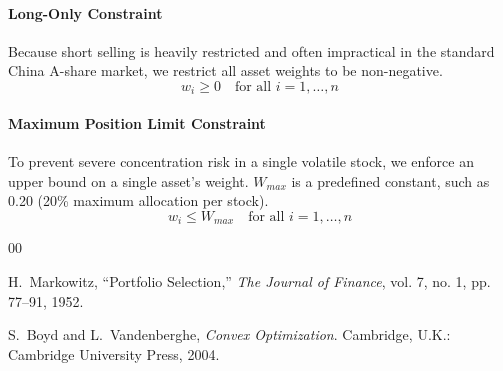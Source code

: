 \documentclass[conference]{IEEEtran}
\begin{document}
\paragraph{Long-Only Constraint}
Because short selling is heavily restricted and often impractical in the standard China A-share market, we restrict all asset weights to be non-negative.
\begin{equation}
    w_i \ge 0 \quad \text{for all } i=1, \dots, n
\end{equation}

\paragraph{Maximum Position Limit Constraint}
To prevent severe concentration risk in a single volatile stock, we enforce an upper bound on a single asset's weight. $W_{max}$ is a predefined constant, such as 0.20 (20\% maximum allocation per stock).
\begin{equation}
    w_i \le W_{max} \quad \text{for all } i=1, \dots, n
\end{equation}

\begin{thebibliography}{00}

H.~Markowitz, ``Portfolio Selection,'' \textit{The Journal of Finance}, vol. 7, no. 1, pp. 77--91, 1952.

S.~Boyd and L.~Vandenberghe, \textit{Convex Optimization}. Cambridge, U.K.: Cambridge University Press, 2004.

\end{thebibliography}
\end{document}
